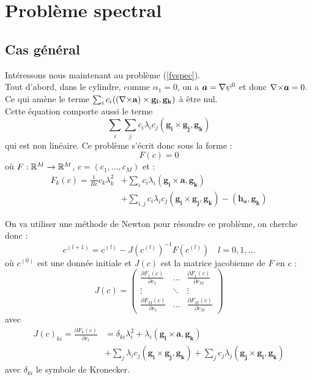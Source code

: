 \chapter{Problème spectral}
\section{Cas général}
\label{PSNewton}
Intéressons nous maintenant au problème (\ref{fvspec}).\\
Tout d'abord, dans le cylindre, comme $\alpha_1=0$, on a $\bm{a}={\nabla}\psi^0$ et donc ${\nabla\times} \bm{a} = 0$. Ce qui amène le terme $\sum_i c_i(({\nabla\times} \mathbf{a})\times \mathbf{g_i}, \mathbf{g_k})$ à être nul.\\
Cette équation comporte aussi le terme
\[ \sum_i\sum_j c_i\lambda_i c_j(\mathbf{g_i}\times \mathbf{g_j}, \mathbf{g_k}) \]
qui est non linéaire. Ce problème s'écrit donc sous la forme :
\[ F(c) = 0 \]
où $F:{\mathbb{R}}^M\rightarrow{\mathbb{R}}^M$, $c=(c_1,\ldots, c_M)$ et :
\begin{align}
F_k(c) = \frac{1}{Re} c_k\lambda_k^2 &+ \sum_i c_i\lambda_i(\mathbf{g_i}\times \mathbf{a}, \mathbf{g_k}) \nonumber \label{psf}\\
&+ \sum_{i,j} c_i\lambda_i c_j (\mathbf{g_i}\times \mathbf{g_j}, \mathbf{g_k}) - (\mathbf{h_a},\mathbf{g_k})
\end{align}

On va utiliser une méthode de Newton pour résoudre ce problème, on cherche donc :
\begin{equation}\label{Newton}
c^{(l+1)} = c^{(l)} - J(c^{(l)})^{-1}F(c^{(l)})\quad l=0,1,\ldots
\end{equation}
où $c^{(0)}$ est une donnée initiale et $J(c)$ est la matrice jacobienne de $F$ en $c$ :
\[ J(c)=
\begin{pmatrix}
\frac{\partial F_1(c)}{\partial c_1} & \ldots & \frac{\partial F_1(c)}{\partial c_M}\\
\vdots & \ddots & \vdots\\
\frac{\partial F_M(c)}{\partial c_1} & \ldots & \frac{\partial F_M(c)}{\partial c_M}
\end{pmatrix}\]
avec 
\begin{align}
J(c)_{ki} = \frac{\partial F_k(c)}{\partial c_i} &= \delta_{ki}\lambda_i^2 + \lambda_i(\mathbf{g_i}\times \mathbf{a},\mathbf{g_k}) \nonumber \label{psj}\\
&+ \sum_j\lambda_i c_j (\mathbf{g_i}\times\mathbf{g_j},\mathbf{g_k}) + \sum_j c_j\lambda_j (\mathbf{g_j}\times\mathbf{g_i},\mathbf{g_k})
\end{align}
avec $\delta_{ki}$ le symbole de Kronecker.\\

